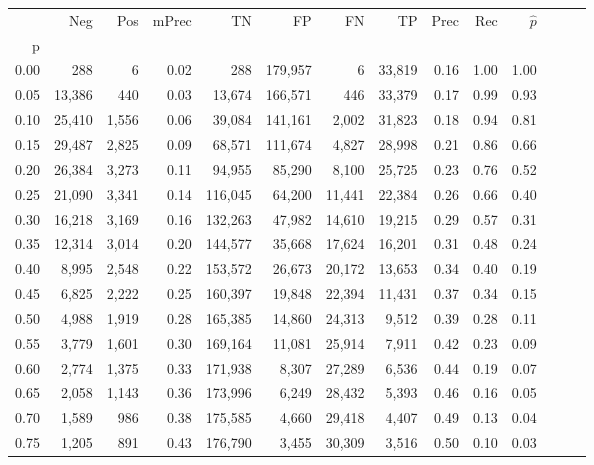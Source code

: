 \begin{tabular}{rrrrrrrrrrrrrr}
\toprule
{} &     Neg &    Pos & mPrec &       TN &       FP &      FN &      TP &  Prec &   Rec & $\hat{p}$ \\
p    &         &        &       &          &          &         &         &       &       &           \\
\midrule
0.00 &     288 &      6 &  0.02 &      288 &  179,957 &       6 &  33,819 &  0.16 &  1.00 &      1.00 \\
0.05 &  13,386 &    440 &  0.03 &   13,674 &  166,571 &     446 &  33,379 &  0.17 &  0.99 &      0.93 \\
0.10 &  25,410 &  1,556 &  0.06 &   39,084 &  141,161 &   2,002 &  31,823 &  0.18 &  0.94 &      0.81 \\
0.15 &  29,487 &  2,825 &  0.09 &   68,571 &  111,674 &   4,827 &  28,998 &  0.21 &  0.86 &      0.66 \\
0.20 &  26,384 &  3,273 &  0.11 &   94,955 &   85,290 &   8,100 &  25,725 &  0.23 &  0.76 &      0.52 \\
0.25 &  21,090 &  3,341 &  0.14 &  116,045 &   64,200 &  11,441 &  22,384 &  0.26 &  0.66 &      0.40 \\
0.30 &  16,218 &  3,169 &  0.16 &  132,263 &   47,982 &  14,610 &  19,215 &  0.29 &  0.57 &      0.31 \\
0.35 &  12,314 &  3,014 &  0.20 &  144,577 &   35,668 &  17,624 &  16,201 &  0.31 &  0.48 &      0.24 \\
0.40 &   8,995 &  2,548 &  0.22 &  153,572 &   26,673 &  20,172 &  13,653 &  0.34 &  0.40 &      0.19 \\
0.45 &   6,825 &  2,222 &  0.25 &  160,397 &   19,848 &  22,394 &  11,431 &  0.37 &  0.34 &      0.15 \\
0.50 &   4,988 &  1,919 &  0.28 &  165,385 &   14,860 &  24,313 &   9,512 &  0.39 &  0.28 &      0.11 \\
0.55 &   3,779 &  1,601 &  0.30 &  169,164 &   11,081 &  25,914 &   7,911 &  0.42 &  0.23 &      0.09 \\
0.60 &   2,774 &  1,375 &  0.33 &  171,938 &    8,307 &  27,289 &   6,536 &  0.44 &  0.19 &      0.07 \\
0.65 &   2,058 &  1,143 &  0.36 &  173,996 &    6,249 &  28,432 &   5,393 &  0.46 &  0.16 &      0.05 \\
0.70 &   1,589 &    986 &  0.38 &  175,585 &    4,660 &  29,418 &   4,407 &  0.49 &  0.13 &      0.04 \\
0.75 &   1,205 &    891 &  0.43 &  176,790 &    3,455 &  30,309 &   3,516 &  0.50 &  0.10 &      0.03 \\

\end{tabular}
